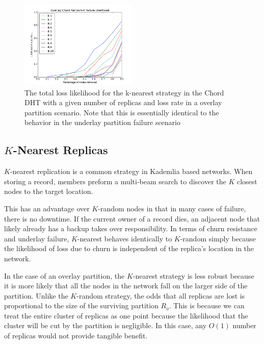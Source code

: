 	\begin{figure}[h!]
		\includegraphics[width=0.5\textwidth]{figs/overlay_chord_random}
		\caption{The total loss likelihood for the k-nearest strategy in the Chord DHT with a given number of replicas and loss rate in a overlay partition scenario. Note that this is essentially identical to the behavior in the underlay partition failure scenario}
	\end{figure}
	
	
	
	\subsection{$K$-Nearest Replicas}
	$K$-nearest replication is a common strategy in Kademlia based networks.
	When storing a record, members preform a multi-beam search to discover the $K$ closest nodes to the target location.
	
	This has an advantage over $K$-random nodes in that in many cases of failure, there is no downtime.
	If the current owner of a record dies, an adjacent node that likely already has a backup takes over responsibility.
	In terms of churn resistance and underlay failure, $K$-nearest behaves identically to $K$-random simply because the likelihood of loss due to churn is independent of the replica's location in the network.
	
	In the case of an overlay partition, the $K$-nearest strategy is less robust because it is more likely that all the nodes in the network fall on the larger side of the partition.
	Unlike the $K$-random strategy, the odds that all replicas are lost is proportional to the size of the surviving partition $R_{o}$.
	This is because we can treat the entire cluster of replicas as one point because the likelihood that the cluster will be cut by the partition is negligible.
	In this case, any $O(1)$ number of replicas would not provide tangible benefit.
	
